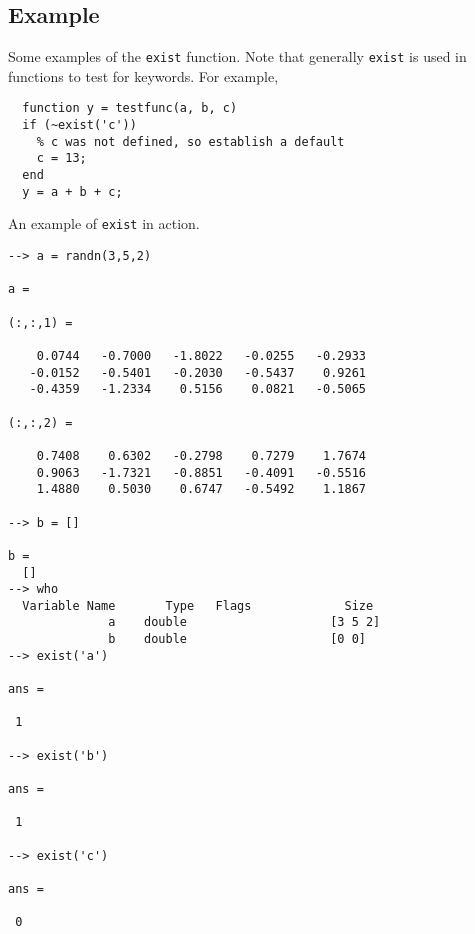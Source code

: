 \subsection{Example}

Some examples of the \verb|exist| function.  Note that generally \verb|exist|
is used in functions to test for keywords.  For example,
\begin{verbatim}
  function y = testfunc(a, b, c)
  if (~exist('c'))
    % c was not defined, so establish a default
    c = 13;
  end
  y = a + b + c;
\end{verbatim}
An example of \verb|exist| in action.
\begin{verbatim}
--> a = randn(3,5,2)

a = 

(:,:,1) = 

    0.0744   -0.7000   -1.8022   -0.0255   -0.2933 
   -0.0152   -0.5401   -0.2030   -0.5437    0.9261 
   -0.4359   -1.2334    0.5156    0.0821   -0.5065 

(:,:,2) = 

    0.7408    0.6302   -0.2798    0.7279    1.7674 
    0.9063   -1.7321   -0.8851   -0.4091   -0.5516 
    1.4880    0.5030    0.6747   -0.5492    1.1867 

--> b = []

b = 
  []
--> who
  Variable Name       Type   Flags             Size
              a    double                    [3 5 2]
              b    double                    [0 0]
--> exist('a')

ans = 

 1 

--> exist('b')

ans = 

 1 

--> exist('c')

ans = 

 0 
\end{verbatim}
